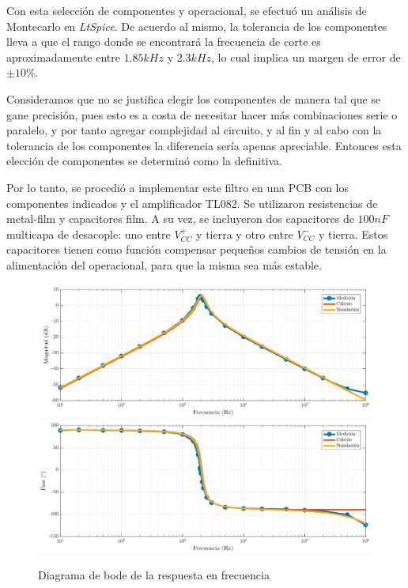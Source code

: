 \documentclass[../../tc_tp3_main.tex]{subfiles}
\begin{document}
Con esta selecci\'on de componentes y operacional, se efectu\'o un an\'alisis de Montecarlo en \textit{LtSpice}. De acuerdo al mismo, la tolerancia de los componentes lleva a que el rango donde se encontrar\'a la frecuencia de corte es aproximadamente entre $1.85kHz$ y $2.3kHz$, lo cual implica un margen de error de $\pm 10\%$. \par

Consideramos que no se justifica elegir los componentes de manera tal que se gane precisi\'on, pues esto es a costa de necesitar hacer m\'as combinaciones serie o paralelo, y por tanto agregar complejidad al circuito, y al fin y al cabo con la tolerancia de los componentes la diferencia ser\'ia apenas apreciable. Entonces esta elecci\'on de componentes se determin\'o como la definitiva.\par

Por lo tanto, se procedi\'o a implementar este filtro en una PCB con los componentes indicados y el amplificador TL082. Se utilizaron resistencias de metal-film y capacitores film. A su vez, se incluyeron dos capacitores de $100nF$ multicapa de desacople: uno entre $V_{CC}^+$ y tierra y otro entre $V_{CC}^-$ y tierra. Estos capacitores tienen como funci\'on compensar peque\~nos cambios de tensi\'on en la alimentaci\'on del operacional, para que la misma sea m\'as estable.

\begin{figure}[t]
	\centering
  	\includegraphics[scale = 0.5]{imagenes/tc_tp3_ej1_hf_mag.png}
  	\includegraphics[scale = 0.5]{imagenes/tc_tp3_ej1_hf_fase.png}
  	\caption{Diagrama de bode de la respuesta en frecuencia}
  	\label{fig:1-rtafrec}
\end{figure}
\end{document}
